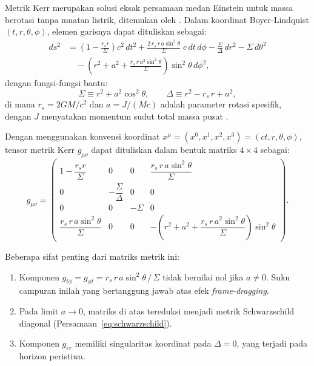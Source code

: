 Metrik Kerr merupakan solusi eksak persamaan medan Einstein untuk massa berotasi tanpa muatan listrik, ditemukan oleh \textcite{Kerr1963KerrMetric}. Dalam koordinat Boyer-Lindquist $(t, r, \theta, \phi)$, elemen garisnya dapat dituliskan sebagai:
\begin{equation}
\begin{split}
    ds^2 &= \left(1 - \frac{r_s r}{\Sigma}\right) c^2\,dt^2
          + \frac{2\,r_s\, r\, a \sin^2\!\theta}{\Sigma}\; c\,dt\,d\phi
          - \frac{\Sigma}{\Delta}\, dr^2
          - \Sigma\, d\theta^2 \\
         &\quad - \left(r^2 + a^2 + \frac{r_s\, r\, a^2 \sin^2\!\theta}{\Sigma}\right)
           \sin^2\!\theta\, d\phi^2,
\end{split}
    \label{eq:kerr-line}
\end{equation}
dengan fungsi-fungsi bantu:
\begin{equation}
    \Sigma \equiv r^2 + a^2 \cos^2\!\theta, \qquad
    \Delta \equiv r^2 - r_s\, r + a^2,
    \label{eq:sigma-delta}
\end{equation}
di mana $r_s = 2GM/c^2$ dan $a = J/(Mc)$ adalah parameter rotasi spesifik, dengan $J$ menyatakan momentum sudut total massa pusat \parencite{Kerr1963KerrMetric, Carroll2004SpacetimeGeometry}.

Dengan menggunakan konvensi koordinat $x^\mu = (x^0, x^1, x^2, x^3) = (ct, r, \theta, \phi)$, tensor metrik Kerr $g_{\mu\nu}$ dapat dituliskan dalam bentuk matriks $4 \times 4$ sebagai:
\begin{equation}
    g_{\mu\nu} =
    \begin{pmatrix}
        1 - \dfrac{r_s r}{\Sigma} & 0 & 0 & \dfrac{r_s\, r\, a \sin^2\!\theta}{\Sigma} \\[12pt]
        0 & -\dfrac{\Sigma}{\Delta} & 0 & 0 \\[12pt]
        0 & 0 & -\Sigma & 0 \\[12pt]
        \dfrac{r_s\, r\, a \sin^2\!\theta}{\Sigma} & 0 & 0
        & -\!\left(r^2 + a^2 + \dfrac{r_s\, r\, a^2 \sin^2\!\theta}{\Sigma}\right)\sin^2\!\theta
    \end{pmatrix}.
    \label{eq:kerr-matrix}
\end{equation}

Beberapa sifat penting dari matriks metrik ini:
\begin{enumerate}[label=(\roman*)]
    \item Komponen $g_{t\phi} = g_{\phi t} = r_s\, r\, a \sin^2\!\theta\,/\,\Sigma$ tidak bernilai nol jika $a \neq 0$. Suku campuran inilah yang bertanggung jawab atas efek \textit{frame-dragging}.
    \item Pada limit $a \to 0$, matriks di atas tereduksi menjadi metrik Schwarzschild diagonal (Persamaan~\ref{eq:schwarzschild}).
    \item Komponen $g_{rr}$ memiliki singularitas koordinat pada $\Delta = 0$, yang terjadi pada horizon peristiwa.
\end{enumerate}

